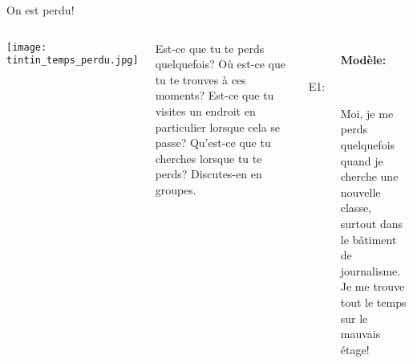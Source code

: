\begin{frame}{On est perdu!}
  \begin{columns}
      \begin{center}
        \texttt{[image: tintin\_temps\_perdu.jpg]}
      \end{center}
      Est-ce que \alert{tu te perds} quelquefois?
      Où est-ce que \alert{tu te trouves} à ces moments? 
      Est-ce que \alert{tu visites} un endroit en particulier lorsque cela se passe?
      Qu'est-ce que \alert{tu cherches} lorsque tu te perds?
      Discutes-en en groupes.
      \begin{description}
        \item[] \textbf{Modèle:}
        \item[E1:] Moi, \alert{je me perds} quelquefois quand \alert{je cherche} une nouvelle classe, surtout dans le bâtiment de journalisme. \alert{Je me trouve} tout le temps sur le mauvais étage!
      \end{description}
  \end{columns}
\end{frame}